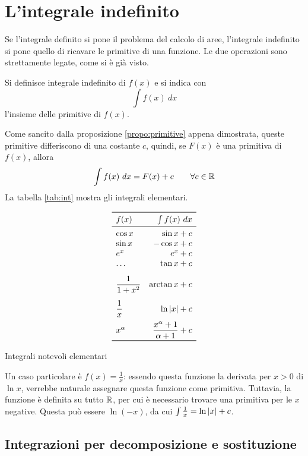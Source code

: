 \section{L'integrale indefinito}
Se l'integrale definito si pone il problema del calcolo di aree, l'integrale indefinito si pone quello di ricavare le primitive di una funzione. Le due operazioni sono strettamente legate, come si è già visto.
\begin{defin}
	Si definisce integrale indefinito di $f(x)$ e si indica con
	\[
		\int f(x)~dx
	\]
	l'insieme delle primitive di $f(x)$.
\end{defin}
Come sancito dalla proposizione \ref{propo:primitive} appena dimostrata, queste primitive differiscono di una costante $c$, quindi, se $F(x)$ è una primitiva di $f(x)$, allora
\[
	\int f(x)~dx=F(x)+c\qquad\forall c\in\mathbb{R}
\]
La tabella \ref{tab:int} mostra gli integrali elementari.
\begin{table}[ht]
	\centering
	\[
		\begin{array}{lr}
			\toprule
			f(x)             & \int f(x)~dx                    \\
			\midrule
			\cos x           & \sin x +c                       \\
			\sin x           & -\cos x +c                      \\
			e^x              & e^x +c                          \\
			\dots            & \tan x +c                       \\[2ex]
			\dfrac{1}{1+x^2} & \arctan x +c                    \\[3ex]
			\dfrac{1}{x}     & \ln\abs{x} +c                   \\[2ex]
			x^\alpha         & \dfrac{x^\alpha+1}{\alpha+1} +c \\
			\bottomrule
		\end{array}
	\]
	\caption{Integrali notevoli elementari}
	\label{tab:int}
\end{table}

Un caso particolare è $f(x)=\frac{1}{x}$: essendo questa funzione la derivata per $x>0$ di $\ln x$, verrebbe naturale assegnare questa funzione come primitiva. Tuttavia, la funzione è definita su tutto $\mathbb{R}$, per cui è necessario trovare una primitiva per le $x$ negative. Questa può essere $\ln (-x)$, da cui $\int \frac{1}{x}=\ln\left\lvert x \right\rvert+c$.


\subsection[Decomposizione e sostituzione]{Integrazioni per decomposizione e sostituzione}

